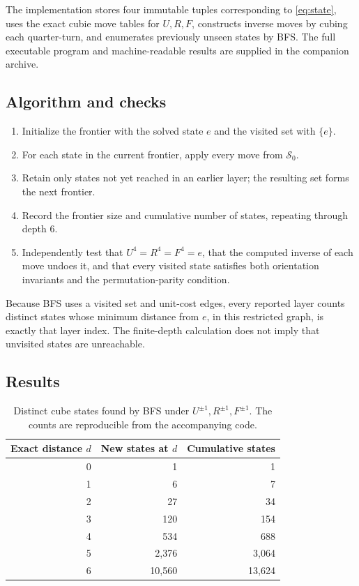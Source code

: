 \documentclass[11pt,a4paper]{article}
\theoremstyle{definition}
\theoremstyle{remark}
\newcommand{\moves}{\mathcal{S}}
\begin{document}
The implementation stores four immutable tuples corresponding to \cref{eq:state}, uses the exact cubie move tables for $U,R,F$, constructs inverse moves by cubing each quarter-turn, and enumerates previously unseen states by BFS. The full executable program and machine-readable results are supplied in the companion archive.

\subsection{Algorithm and checks}
\begin{enumerate}[leftmargin=*,itemsep=3pt]
\item Initialize the frontier with the solved state $e$ and the visited set with $\{e\}$.
\item For each state in the current frontier, apply every move from $\moves_0$.
\item Retain only states not yet reached in an earlier layer; the resulting set forms the next frontier.
\item Record the frontier size and cumulative number of states, repeating through depth $6$.
\item Independently test that $U^4=R^4=F^4=e$, that the computed inverse of each move undoes it, and that every visited state satisfies both orientation invariants and the permutation-parity condition.
\end{enumerate}

Because BFS uses a visited set and unit-cost edges, every reported layer counts distinct states whose minimum distance from $e$, in this restricted graph, is exactly that layer index. The finite-depth calculation does not imply that unvisited states are unreachable.

\subsection{Results}
\begin{table}[htbp]
\centering
\caption{Distinct cube states found by BFS under $U^{\pm1},R^{\pm1},F^{\pm1}$. The counts are reproducible from the accompanying code.}
\label{tab:bfs}
\begin{tabular}{@{}rrr@{}}
\toprule
\textbf{Exact distance $d$} & \textbf{New states at $d$} & \textbf{Cumulative states}\\
\midrule
0 & 1 & 1\\
1 & 6 & 7\\
2 & 27 & 34\\
3 & 120 & 154\\
4 & 534 & 688\\
5 & 2,376 & 3,064\\
6 & 10,560 & 13,624\\
\bottomrule
\end{tabular}
\end{table}
\end{document}
